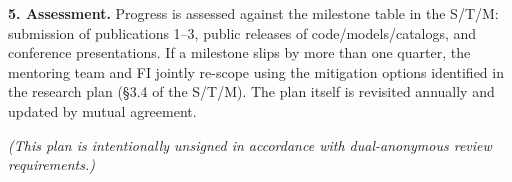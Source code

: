 \documentclass[12pt,letterpaper]{article}
\begin{document}
\noindent\textbf{5. Assessment.}
Progress is assessed against the milestone table in the S/T/M: submission
of publications 1--3, public releases of code/models/catalogs, and
conference presentations. If a milestone slips by more than one quarter,
the mentoring team and FI jointly re-scope using the mitigation options
identified in the research plan (\S3.4 of the S/T/M). The plan itself is
revisited annually and updated by mutual agreement.

\noindent\emph{(This plan is intentionally unsigned in accordance with
dual-anonymous review requirements.)}
\end{document}
